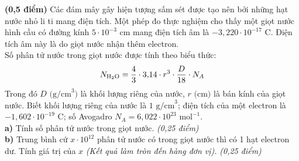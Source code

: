 \documentclass[11pt,a4paper]{article}
\begin{document}
\begin{ex}
\textbf{(0,5 điểm)} Các đám mây gây hiện tượng sấm sét được tạo nên bởi những hạt nước nhỏ li ti mang điện tích. Một phép đo thực nghiệm cho thấy một giọt nước hình cầu có đường kính $5 \cdot 10^{-3}\text{ cm}$ mang điện tích âm là $-3{,}220 \cdot 10^{-17}\text{ C}$. Điện tích âm này là do giọt nước nhận thêm electron.\\
Số phân tử nước trong giọt nước được tính theo biểu thức:
\[
N_{\ce{H2O}} = \dfrac{4}{3} \cdot 3{,}14 \cdot r^3 \cdot \dfrac{D}{18} \cdot N_A
\]
Trong đó $D\text{ (g/cm}^3\text{)}$ là khối lượng riêng của nước, $r\text{ (cm)}$ là bán kính của giọt nước. Biết khối lượng riêng của nước là $1\text{ g/cm}^3$; điện tích của một electron là $-1{,}602 \cdot 10^{-19}\text{ C}$; số Avogadro $N_A = 6{,}022 \cdot 10^{23}\text{ mol}^{-1}$.\\
\textbf{a)} Tính số phân tử nước trong giọt nước. \textit{(0,25 điểm)}\\
\textbf{b)} Trung bình cứ $x \cdot 10^{12}$ phân tử nước có trong giọt nước thì có 1 hạt electron dư. Tính giá trị của $x$ \textit{(Kết quả làm tròn đến hàng đơn vị).} \textit{(0,25 điểm)}
\end{ex}
\end{document}

